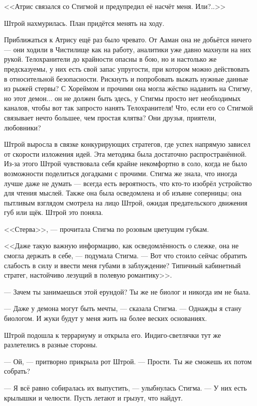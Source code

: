 <<Атрис связался со Стигмой и предупредил её насчёт меня.
Или?..>>

Штрой нахмурилась.
План придётся менять на ходу.

Приближаться к Атрису ещё раз было чревато.
От Ааман она не добьётся ничего --- они ходили в Чистилище как на работу, аналитики уже давно махнули на них рукой.
Телохранители до крайности опасны в бою, но и настолько же предсказуемы, у них есть свой запас упругости, при котором можно действовать в относительной безопасности.
Рискнуть и попробовать выжать нужные данные из рыжей стервы?
С Хореймом и прочими она могла жёстко надавить на Стигму, но этот демон... он не должен быть здесь, у Стигмы просто нет необходимых каналов, чтобы вот так запросто нанять Телохранителя!
Что, если его со Стигмой связывает нечто большее, чем простая клятва?
Они друзья, приятели, любовники?

Штрой выросла в связке конкурирующих стратегов, где успех напрямую зависел от скорости изложения идей.
Эта методика была достаточно распространённой.
Из-за этого Штрой чувствовала себя крайне некомфортно в соло, когда не было возможности поделиться догадками с прочими.
Стигма же знала, что иногда лучше даже не думать --- всегда есть вероятность, что кто-то изобрёл устройство для чтения мыслей.
Также она была осведомлена и об изъяне соперницы;
она пытливым взглядом смотрела на лицо Штрой, ожидая предательского движения губ или щёк.
Штрой это поняла.

<<Стерва>>, --- прочитала Стигма по розовым цветущим губкам.

<<Даже такую важную информацию, как осведомлённость о слежке, она не смогла держать в себе, --- подумала Стигма.
--- Вот что стоило сейчас обратить слабость в силу и ввести меня губами в заблуждение?
Типичный кабинетный стратег, настойчиво лезущий в полевую романтику>>.

\textspace

--- Зачем ты занимаешься этой ерундой?
Ты же не биолог и никогда им не была.

--- Даже у демона могут быть мечты, --- сказала Стигма.
--- Однажды я стану биологом.
И жуки будут у меня жить на более веских основаниях.

Штрой подошла к террариуму и открыла его.
Индиго-светлячки тут же разлетелись в разные стороны.

--- Ой, --- притворно прикрыла рот Штрой.
--- Прости.
Ты же сможешь их потом собрать?

--- Я всё равно собиралась их выпустить, --- улыбнулась Стигма.
--- У них есть крылышки и челюсти.
Пусть летают и грызут, что найдут.

